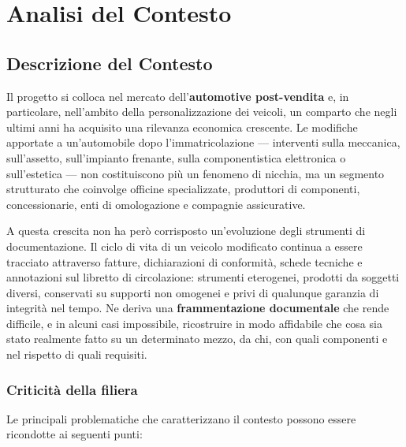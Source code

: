 \chapter{Analisi del Contesto}

\section{Descrizione del Contesto}

Il progetto si colloca nel mercato dell'\textbf{automotive post-vendita} e, in particolare, nell'ambito della personalizzazione dei veicoli, un comparto che negli ultimi anni ha acquisito una rilevanza economica crescente. Le modifiche apportate a un'automobile dopo l'immatricolazione --- interventi sulla meccanica, sull'assetto, sull'impianto frenante, sulla componentistica elettronica o sull'estetica --- non costituiscono più un fenomeno di nicchia, ma un segmento strutturato che coinvolge officine specializzate, produttori di componenti, concessionarie, enti di omologazione e compagnie assicurative.

A questa crescita non ha però corrisposto un'evoluzione degli strumenti di documentazione. Il ciclo di vita di un veicolo modificato continua a essere tracciato attraverso fatture, dichiarazioni di conformità, schede tecniche e annotazioni sul libretto di circolazione: strumenti eterogenei, prodotti da soggetti diversi, conservati su supporti non omogenei e privi di qualunque garanzia di integrità nel tempo. Ne deriva una \textbf{frammentazione documentale} che rende difficile, e in alcuni casi impossibile, ricostruire in modo affidabile che cosa sia stato realmente fatto su un determinato mezzo, da chi, con quali componenti e nel rispetto di quali requisiti.

\subsection*{Criticit\`a della filiera}

Le principali problematiche che caratterizzano il contesto possono essere ricondotte ai seguenti punti:

